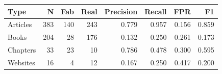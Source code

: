 \begin{tabular}{lrrrrrrr}
\toprule
Type & N & Fab & Real & Precision & Recall & FPR & F1 \\
\midrule
Articles & 383 & 140 & 243 & 0.779 & 0.957 & 0.156 & 0.859 \\
Books & 204 & 28 & 176 & 0.132 & 0.250 & 0.261 & 0.173 \\
Chapters & 33 & 23 & 10 & 0.786 & 0.478 & 0.300 & 0.595 \\
Websites & 16 & 4 & 12 & 0.167 & 0.250 & 0.417 & 0.200 \\
\bottomrule
\end{tabular}
